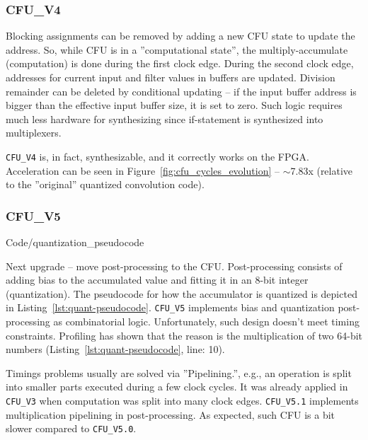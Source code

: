 \subsubsection{CFU\_V4}

Blocking assignments can be removed by adding a new CFU state to update the address. So, while CFU is in a ''computational state'', the multiply-accumulate (computation) is done during the first clock edge. During the second clock edge, addresses for current input and filter values in buffers are updated. Division remainder can be deleted by conditional updating -- if the input buffer address is bigger than the effective input buffer size, it is set to zero. Such logic requires much less hardware for synthesizing since if-statement is synthesized into multiplexers. 

\verb|CFU_V4| is, in fact, synthesizable, and it correctly works on the FPGA. Acceleration can be seen in Figure~\ref{fig:cfu_cycles_evolution} -- $\sim$7.83x (relative to the ''original'' quantized convolution code).

\subsubsection{CFU\_V5}

\begin{minipage}{\textwidth}

    {
        Code/quantization_pseudocode
    }
\end{minipage}

Next upgrade -- move post-processing to the CFU. Post-processing consists of adding bias to the accumulated value and fitting it in an 8-bit integer (quantization). The pseudocode for how the accumulator is quantized is depicted in Listing~\ref{lst:quant-pseudocode}. \verb|CFU_V5| implements bias and quantization post-processing as combinatorial logic. Unfortunately, such design doesn't meet timing constraints. Profiling has shown that the reason is the multiplication of two 64-bit numbers (Listing~\ref{lst:quant-pseudocode}, line: 10). 

Timings problems usually are solved via ''Pipelining.'', e.g., an operation is split into smaller parts executed during a few clock cycles. It was already applied in \verb|CFU_V3| when computation was split into many clock edges. 
\verb|CFU_V5.1| implements multiplication pipelining in post-processing. As expected, such CFU is a bit slower compared to \verb|CFU_V5.0|. 

